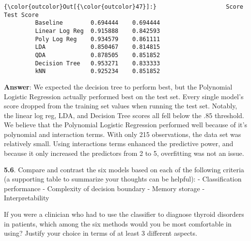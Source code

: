 \documentclass[11pt]{article}
\begin{document}
\begin{Verbatim}[commandchars=\\\{\}]
{\color{outcolor}Out[{\color{outcolor}47}]:}                    Score  Test Score
         Baseline        0.694444    0.694444
         Linear Log Reg  0.915888    0.842593
         Poly Log Reg    0.934579    0.861111
         LDA             0.850467    0.814815
         QDA             0.878505    0.851852
         Decision Tree   0.953271    0.833333
         kNN             0.925234    0.851852
\end{Verbatim}
            
    \textbf{Answer}: We expected the decision tree to perform best, but the
Polynomial Logistic Regression actually performed best on the test set.
Every single model's score dropped from the training set values when
running the test set. Notably, the linear log reg, LDA, and Decision
Tree scores all fell below the .85 threshold. We believe that the
Polynomial Logistic Regression performed well because of it's polynomial
and interaction terms. With only 215 observations, the data set was
relatively small. Using interactions terms enhanced the predictive
power, and because it only increased the predictors from 2 to 5,
overfitting was not an issue.

    \textbf{5.6}. Compare and contrast the six models based on each of the
following criteria (a supporting table to summarize your thoughts can be
helpful): - Classification performance - Complexity of decision boundary
- Memory storage - Interpretability

If you were a clinician who had to use the classifier to diagnose
thyroid disorders in patients, which among the six methods would you be
most comfortable in using? Justify your choice in terms of at least 3
different aspects.
\end{document}
